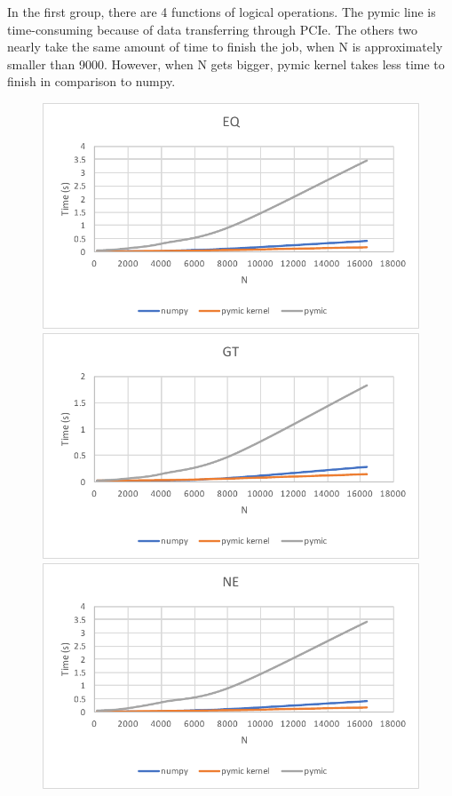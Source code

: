 In the first group, there are 4 functions of logical operations. The pymic line is time-consuming because of data transferring through PCIe. The others two nearly take the same amount of time to finish the job, when N is approximately smaller than 9000. However, when N gets bigger, pymic kernel takes less time to finish in comparison to numpy.
\begin{figure}[]
\includegraphics[scale=0.5]{img/group1/eq.pdf}
\includegraphics[scale=0.5]{img/group1/gt.pdf}
\includegraphics[scale=0.5]{img/group1/ne.pdf}

\end{figure}
